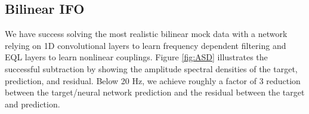 \begin{refsection}
%

%
%
%

\subsection{Bilinear IFO}
We have success solving the most realistic bilinear mock data with a network relying on 1D convolutional layers to learn frequency dependent filtering and EQL layers to learn nonlinear couplings. Figure \ref{fig:ASD} illustrates the successful subtraction 
by showing the amplitude spectral densities of the target, prediction, and residual. Below 20 Hz, we achieve roughly a factor of 3 reduction between the target/neural network prediction and the residual between the target and prediction.


\end{refsection}

